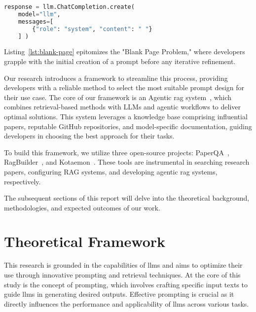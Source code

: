\documentclass[12pt,twoside,english]{article}
\begin{document}
\begin{lstlisting}[style=compactcode, language=Python, caption={\small Example code illustrating the Blank Page Problem}, label={lst:blank-page}]
response = llm.ChatCompletion.create(
    model="llm",
    messages=[
        {"role": "system", "content": " "}
    ] )
\end{lstlisting}

Listing~\ref{lst:blank-page} epitomizes the "Blank Page Problem," where developers grapple with the initial creation of a prompt before any iterative refinement.

Our research introduces a framework to streamline this process, providing developers with a reliable method to select the most suitable prompt design for their use case. The core of our framework is an Agentic \gls{rag} system~\cite{lewis2021retrievalaugmentedgenerationknowledgeintensivenlp}, which combines retrieval-based methods with LLMs and agentic workflows to deliver optimal solutions. This system leverages a knowledge base comprising influential papers, reputable GitHub repositories, and model-specific documentation, guiding developers in choosing the best approach for their tasks.

To build this framework, we utilize three open-source projects: PaperQA~\cite{Skarlinski2024PaperQA}, RagBuilder~\cite{KruxAI2024RagBuilder}, and Kotaemon~\cite{Cinnamon2024Kotaemon}. These tools are instrumental in searching research papers, configuring RAG systems, and developing agentic \gls{rag} systems, respectively.

The subsequent sections of this report will delve into the theoretical background, methodologies, and expected outcomes of our work. 
\clearpage

\section{Theoretical Framework}
\label{sec:background}

This research is grounded in the capabilities of \glspl{llm} and aims to optimize their use through innovative prompting and retrieval techniques. At the core of this study is the concept of prompting, which involves crafting specific input texts to guide \glspl{llm} in generating desired outputs. Effective prompting is crucial as it directly influences the performance and applicability of \glspl{llm} across various tasks.
\end{document}
